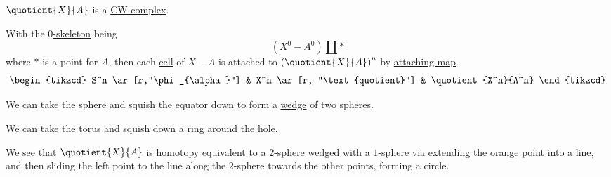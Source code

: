 \begin{remark}
	\(\quotient{X}{A} \) is a \hyperref[def:CW-Complex]{CW complex}.
\end{remark}
\begin{explanation}
	With the \hyperref[def:skeleton]{\(0\)-skeleton} being
	\[
		(X^0 - A^0)\coprod \ast
	\]
	where \(\ast\) is a point for \(A\), then each \hyperref[def:cell]{cell} of \(X-A\) is attached to \(\left(\quotient{X}{A} \right)^n\) by \hyperref[def:attaching-map]{attaching map}
	\[
		\begin{tikzcd}
			S^n \ar[r,"\phi_{\alpha}"] & X^n \ar[r, "\text{quotient}"] & \quotient{X^n}{A^n}
		\end{tikzcd}
	\]
\end{explanation}

\begin{eg}
	We can take the sphere and squish the equator down to form a \hyperref[CW-complex-wedge-sum]{wedge} of two spheres.
	\begin{center}
	\end{center}
\end{eg}

\begin{eg}
	We can take the torus and squish down a ring around the hole.
	\begin{center}
	\end{center}
	We see that \(\quotient{X}{A}\) is \hyperref[def:homotopy-equivalence]{homotopy equivalent} to a \(2\)-sphere \hyperref[CW-complex-wedge-sum]{wedged} with a \(1\)-sphere via extending the orange point into a line, and then sliding the left point to the line along the \(2\)-sphere towards the other points, forming a circle.
\end{eg}